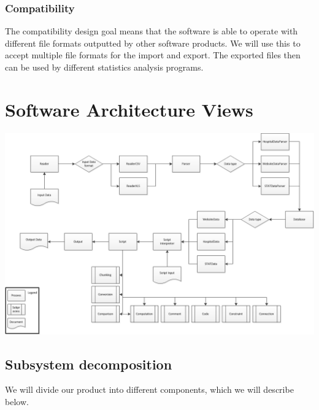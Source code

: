 \documentclass[11pt,twoside,a4paper]{article}
\begin{document}
\subsubsection{Compatibility}
The compatibility design goal means that the software is able to operate with different file formats outputted by other software products. We will use this to accept multiple file formats for the import and export. The exported files then can be used by different statistics analysis programs.
\newpage
\section{Software Architecture Views}
\includegraphics[scale=0.5]{FlowDiagram.png}


\subsection{Subsystem decomposition}
We will divide our product into different components, which we will describe below. 
\end{document}
